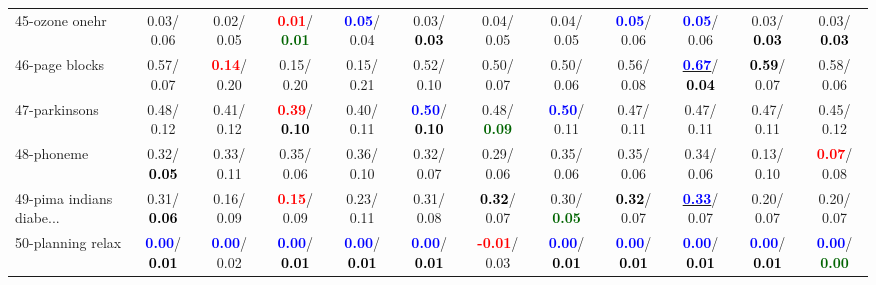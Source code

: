\begin{table}[h]
\begin{center}
{\begin{tabular}{lc|c|c|c|c|c|c|c|c|c|c}
45-ozone onehr &   0.03/  0.06 &   0.02/  0.05 & \textcolor{red}{\textbf{  0.01}}/\textcolor{darkgreen}{\textbf{  0.01}} & \textcolor{blue}{\textbf{  0.05}}/  0.04 &   0.03/\textcolor{black}{\textbf{  0.03}} &   0.04/  0.05 &   0.04/  0.05 & \textcolor{blue}{\textbf{  0.05}}/  0.06 & \textcolor{blue}{\textbf{  0.05}}/  0.06 &   0.03/\textcolor{black}{\textbf{  0.03}} &   0.03/\textcolor{black}{\textbf{  0.03}} \\
46-page blocks &   0.57/  0.07 & \textcolor{red}{\textbf{  0.14}}/  0.20 &   0.15/  0.20 &   0.15/  0.21 &   0.52/  0.10 &   0.50/  0.07 &   0.50/  0.06 &   0.56/  0.08 & \underline{\textcolor{blue}{\textbf{  0.67}}}/\textcolor{black}{\textbf{  0.04}} & \textcolor{black}{\textbf{  0.59}}/  0.07 &   0.58/  0.06 \\ \hline
47-parkinsons &   0.48/  0.12 &   0.41/  0.12 & \textcolor{red}{\textbf{  0.39}}/\textcolor{black}{\textbf{  0.10}} &   0.40/  0.11 & \textcolor{blue}{\textbf{  0.50}}/\textcolor{black}{\textbf{  0.10}} &   0.48/\textcolor{darkgreen}{\textbf{  0.09}} & \textcolor{blue}{\textbf{  0.50}}/  0.11 &   0.47/  0.11 &   0.47/  0.11 &   0.47/  0.11 &   0.45/  0.12 \\
48-phoneme &   0.32/\textcolor{black}{\textbf{  0.05}} &   0.33/  0.11 &   0.35/  0.06 &   0.36/  0.10 &   0.32/  0.07 &   0.29/  0.06 &   0.35/  0.06 &   0.35/  0.06 &   0.34/  0.06 &   0.13/  0.10 & \textcolor{red}{\textbf{  0.07}}/  0.08 \\
49-pima indians diabe... &   0.31/\textcolor{black}{\textbf{  0.06}} &   0.16/  0.09 & \textcolor{red}{\textbf{  0.15}}/  0.09 &   0.23/  0.11 &   0.31/  0.08 & \textcolor{black}{\textbf{  0.32}}/  0.07 &   0.30/\textcolor{darkgreen}{\textbf{  0.05}} & \textcolor{black}{\textbf{  0.32}}/  0.07 & \underline{\textcolor{blue}{\textbf{  0.33}}}/  0.07 &   0.20/  0.07 &   0.20/  0.07 \\
50-planning relax & \textcolor{blue}{\textbf{  0.00}}/\textcolor{black}{\textbf{  0.01}} & \textcolor{blue}{\textbf{  0.00}}/  0.02 & \textcolor{blue}{\textbf{  0.00}}/\textcolor{black}{\textbf{  0.01}} & \textcolor{blue}{\textbf{  0.00}}/\textcolor{black}{\textbf{  0.01}} & \textcolor{blue}{\textbf{  0.00}}/\textcolor{black}{\textbf{  0.01}} & \textcolor{red}{\textbf{ -0.01}}/  0.03 & \textcolor{blue}{\textbf{  0.00}}/\textcolor{black}{\textbf{  0.01}} & \textcolor{blue}{\textbf{  0.00}}/\textcolor{black}{\textbf{  0.01}} & \textcolor{blue}{\textbf{  0.00}}/\textcolor{black}{\textbf{  0.01}} & \textcolor{blue}{\textbf{  0.00}}/\textcolor{black}{\textbf{  0.01}} & \textcolor{blue}{\textbf{  0.00}}/\textcolor{darkgreen}{\textbf{  0.00}} \\

\end{tabular}}
\end{center}
\end{table}
